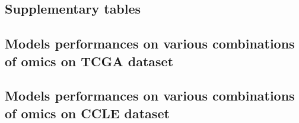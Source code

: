  \begin{landscape}
     \section{Supplementary tables}
      \subsection{Models performances on various combinations of omics on TCGA dataset}
          
          
          
          
          
          
          
          
          
          
          
      \subsection{Models performances on various combinations of omics on CCLE dataset}
          
          
          
          
          
          
          
          
 \end{landscape}